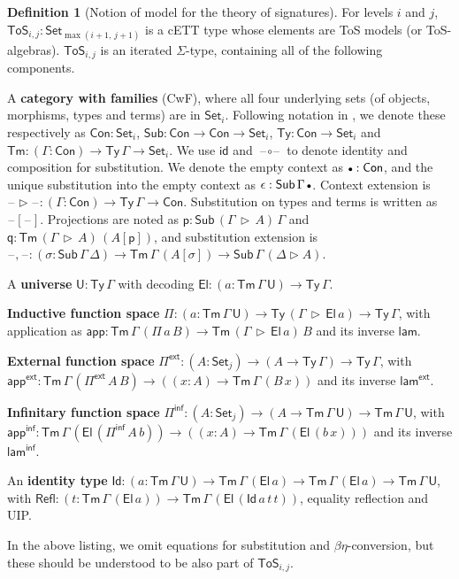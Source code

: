 \documentclass{article}
\theoremstyle{definition}
\newtheorem{definition}{Definition}
\theoremstyle{theorem}
\newcommand{\id}{\mathsf{id}}
\newcommand{\Con}{\mathsf{Con}}
\newcommand{\Sub}{\mathsf{Sub}}
\newcommand{\Tm}{\mathsf{Tm}}
\newcommand{\Ty}{\mathsf{Ty}}
\newcommand{\U}{\mathsf{U}}
\newcommand{\El}{\mathsf{El}}
\newcommand{\Id}{\mathsf{Id}}
\newcommand{\blank}{\mathord{\hspace{1pt}\text{--}\hspace{1pt}}}
\newcommand{\ra}{\rightarrow}
\newcommand{\Set}{\mathsf{Set}}
\newcommand{\ToS}{\mathsf{ToS}}
\newcommand{\ext}{\triangleright}
\newcommand{\emptycon}{\scaleobj{.75}\bullet}
\newcommand{\Pii}{\Pi}
\newcommand{\appi}{\mathsf{app}}
\newcommand{\lami}{\mathsf{lam}}
\newcommand{\Pie}{\Pi^{\mathsf{ext}}}
\newcommand{\appe}{\mathsf{app^{ext}}}
\newcommand{\lame}{\mathsf{lam^{ext}}}
\newcommand{\Piinf}{\Pi^{\mathsf{inf}}}
\newcommand{\appinf}{\mathsf{app^{inf}}}
\newcommand{\laminf}{\mathsf{lam^{inf}}}
\newcommand{\Refl}{\mathsf{Refl}}
\newcommand{\p}{\mathsf{p}}
\newcommand{\q}{\mathsf{q}}
\begin{document}
\begin{definition}[Notion of model for the theory of signatures]\label{def:tos}
For levels $i$ and $j$, $\ToS_{i,j} : \Set_{\max(i+1,\,j+1)}$ is a cETT type whose
elements are ToS models (or ToS-algebras). $\ToS_{i,j}$ is an iterated
$\Sigma$-type, containing all of the following components.

A \textbf{category with families} (CwF), where all four underlying sets (of
objects, morphisms, types and terms) are in $\Set_i$. Following notation in
\cite{kaposi2019constructing}, we denote these respectively as $\Con : \Set_i$,
$\Sub : \Con \ra \Con \ra \Set_i$, $\Ty : \Con \ra \Set_i$ and $\Tm : (\Gamma :
\Con) \ra \Ty\,\Gamma \ra \Set_i$. We use $\id$ and $\blank\circ\blank$ to
denote identity and composition for substitution. We denote the empty context as
$\emptycon : \Con$, and the unique substitution into the empty context as
$\epsilon : \Sub\,\Gamma\,\emptycon$. Context extension is $\blank\ext\blank :
(\Gamma : \Con)\ra \Ty\,\Gamma \ra \Con$. Substitution on types and terms is
written as $\blank[\blank]$. Projections are noted as $\p :
\Sub\,(\Gamma\,\ext\,A)\,\Gamma$ and $\q : \Tm\,(\Gamma\,\ext\,A)\,(A[\p])$, and
substitution extension is $\blank,\blank : (\sigma : \Sub\,\Gamma\,\Delta)\ra
\Tm\,\Gamma\,(A[\sigma])\ra \Sub\,\Gamma\,(\Delta\ext A)$.

A \textbf{universe} $\U : \Ty\,\Gamma$ with decoding $\El : (a :
\Tm\,\Gamma\,\U) \ra \Ty\,\Gamma$.

\textbf{Inductive function space} $\Pii : (a : \Tm\,\Gamma\,\U) \ra
\Ty\,(\Gamma\,\ext\,\El\,a) \ra \Ty\,\Gamma$, with application as $\appi :
\Tm\,\Gamma\,(\Pii\,a\,B)\ra \Tm\,(\Gamma\,\ext\,\El\,a)\,B$ and its
inverse $\lami$.

\textbf{External function space} $\Pie : (A : \Set_j)\ra(A \ra \Ty\,\Gamma)\ra
\Ty\,\Gamma$, with $\appe : \Tm\,\Gamma\,(\Pie\,A\,B)\ra((x : A)\ra
\Tm\,\Gamma\,(B\,x))$ and its inverse $\lame$.

\textbf{Infinitary function space} $\Piinf : (A : \Set_j)\ra(A \ra
\Tm\,\Gamma\,\U)\ra \Tm\,\Gamma\,\U$, with $\appinf :
\Tm\,\Gamma\,(\El\,(\Piinf\,A\,b))\ra((x : A)\ra \Tm\,\Gamma\,(\El\,(b\,x)))$ and
its inverse $\laminf$.

An \textbf{identity type} $\Id : (a : \Tm\,\Gamma\,\U)\ra
\Tm\,\Gamma\,(\El\,a)\ra\Tm\,\Gamma\,(\El\,a)\ra \Tm\,\Gamma\,\U$, with $\Refl :
(t : \Tm\,\Gamma\,(\El\,a))\ra \Tm\,\Gamma\,(\El\,(\Id\,a\,t\,t))$, equality reflection and UIP.

\end{definition}
In the above listing, we omit equations for substitution and
$\beta\eta$-conversion, but these should be understood to be also part of
$\ToS_{i,j}$.
\end{document}
